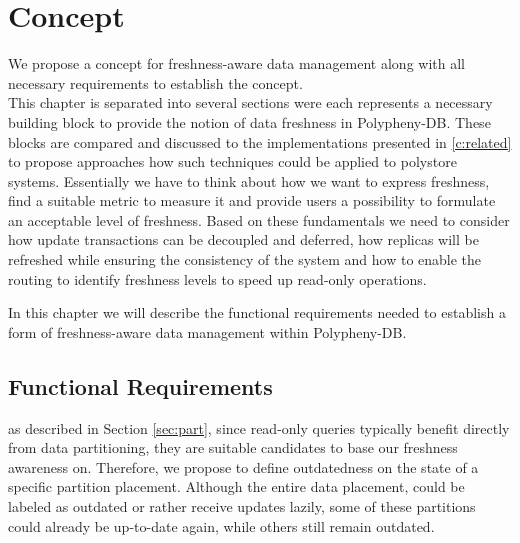 \chapter{Concept}
\label{c:concept}

We propose a concept for freshness-aware data management along with all necessary requirements to establish the concept.\\

This chapter is separated into several sections were each represents a necessary building block to provide the notion of data freshness in Polypheny-DB.
These blocks are compared and discussed to the implementations presented in \ref{c:related} to propose approaches how such techniques could be applied to polystore
systems. Essentially we have to think about how we want to express freshness, find a suitable metric to measure it and provide users a possibility to formulate 
an acceptable level of freshness. Based on these fundamentals we need to consider how update transactions can be decoupled and deferred, how replicas will
be refreshed while ensuring the consistency of the system and how to enable the routing to identify freshness levels to speed up read-only operations. 

In this chapter we will describe the functional requirements needed to establish a form of freshness-aware data management within Polypheny-DB.

\section{Functional Requirements}

as described in Section \ref{sec:part}, since read-only queries typically benefit directly from data partitioning, they are suitable candidates to base our freshness awareness on.
Therefore, we propose to define outdatedness on the state of a specific partition placement.
Although the entire data placement, could be labeled as outdated or rather receive updates lazily, some of 
these partitions could already be up-to-date again, while others still remain outdated.




